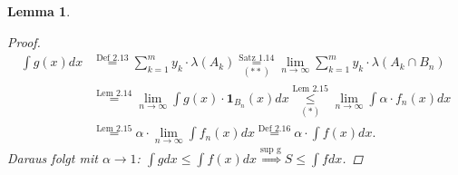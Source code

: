 \documentclass[a4paper]{scrreprt}
\newcommand{\doubleOne}{\textbf{1}}
\newcommand{\toInf}{\rightarrow \infty}
\newcommand{\limToInf}[1]{\lim_{#1 \toInf}}
\newcommand{\jshortlink}[1]{\jhyperref{#1}{\text{#1}}}
\newcommand{\jhyperref}[2]{\hyperref[j_#1]{#2}}
\theoremstyle{plain}
\newtheorem{lem}[thm]{Lemma}
\theoremstyle{definition}
\begin{document}
{{{\begin{lem}
\begin{proof}
        \begin{displaymath}
            \begin{split}
                \int g(x) dx &\overset{\jshortlink{Def 2.13}}{=} \sum_{k=1}^m y_k \cdot \lambda(A_k) \overset{\jshortlink{Satz 1.14}}{\underset{(**)}{=}} \limToInf{n} \sum_{k=1}^m y_k \cdot \lambda(A_k \cap B_n)\\
                &\overset{\jshortlink{Lem 2.14}}{=} \limToInf{n} \int g(x)\cdot \doubleOne_{B_n}(x) dx \overset{\jshortlink{Lem 2.15}}{\underset{(*)}{\le}} \limToInf{n} \int \alpha\cdot  f_n(x) dx\\
                &\overset{\jshortlink{Lem 2.15}}{=} \alpha\cdot \limToInf{n} \int f_n(x) dx \overset{\jshortlink{Def 2.16}}{=} \alpha\cdot \int f(x) dx.
            \end{split}
        \end{displaymath}
         Daraus folgt mit $\alpha \rightarrow 1$: $\int g dx \le \int f(x) dx \overset{\text{sup g}}{\Rightarrow} S \le \int f dx$.
    \end{proof}
\end{lem}

}}}
\end{document}
